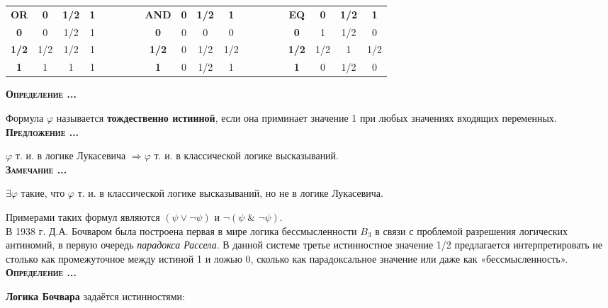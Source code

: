 \documentclass[18pt, a4paper]{extarticle}
\newcounter{par}
\newcounter{spar}
\newcounter{zap}
\newcommand{\opr}{\textbf{\textsc{Определение \thepar.\if\thespar1\thespar.\fi\thezap.\;}}\stepcounter{zap}}
\newcommand{\predl}{\textbf{\textsc{Предложение \thepar.\if\thespar1\thespar.\fi\thezap.\;}}\stepcounter{zap}}
\newcommand{\zam}{\textbf{\textsc{Замечание \thepar.\if\thespar1\thespar.\fi\thezap.\;}}\stepcounter{zap}}
\newcommand{\ampersand}{\;\&\;}
\begin{document}
\begin{center}
\begin{tabular}{|c|c|c|c|llll|c|c|c|c|llll|c|c|c|c|}
\cline{1-4} \cline{9-12} \cline{17-20}
\textbf{OR} & \textbf{0} & \textbf{1/2} & \textbf{1} & & & & & \textbf{AND} & \textbf{0} & \textbf{1/2} & \textbf{1} & & & & & \textbf{EQ} & \textbf{0} & \textbf{1/2} & \textbf{1} \\
\cline{1-4} \cline{9-12} \cline{17-20} 
\textbf{0} & 0 & 1/2 & 1 & & & & & \textbf{0} & 0 & 0 & 0 & & & & & \textbf{0} & 1 & 1/2 & 0 \\ 
\cline{1-4} \cline{9-12} \cline{17-20} 
\textbf{1/2} & 1/2 & 1/2 & 1 & & & & & \textbf{1/2} & 0 & 1/2 & 1/2 & & & & & \textbf{1/2} & 1/2 & 1 & 1/2 \\ 
\cline{1-4} \cline{9-12} \cline{17-20} 
\textbf{1} & 1 & 1 & 1 & & & & & \textbf{1} & 0 & 1/2 & 1 & & & & & \textbf{1} & 0 & 1/2 & 0 \\ 
\cline{1-4} \cline{9-12} \cline{17-20} 
\end{tabular}
\end{center}

\opr

Формула $\varphi$ называется \textbf{тождественно истинной}, если она приминает значение 1 при любых значениях входящих переменных.\\

\predl

$\varphi$ т. и. в логике Лукасевича $\Rightarrow \varphi$ т. и. в классической логике высказываний.\\

\zam

$\exists \varphi$ такие, что $\varphi$ т. и. в классической логике высказываний, но не в логике Лукасевича.

Примерами таких формул являются $(\psi\vee\lnot\psi)$ и $\lnot(\psi\ampersand\lnot\psi)$.\\

В 1938 г. Д.А. Бочваром была построена первая в мире логика бессмысленности $B_3$ в связи с проблемой разрешения логических антиномий, в первую очередь
\textit{парадокса Рассела}. В данной системе третье истинностное значение 1/2 предлагается интерпретировать не столько как промежуточное между истиной 1 и ложью 0, сколько как парадоксальное значение или даже как «бессмысленность».\\

\opr

\textbf{Логика Бочвара} задаётся истинностями: 
\end{document}
